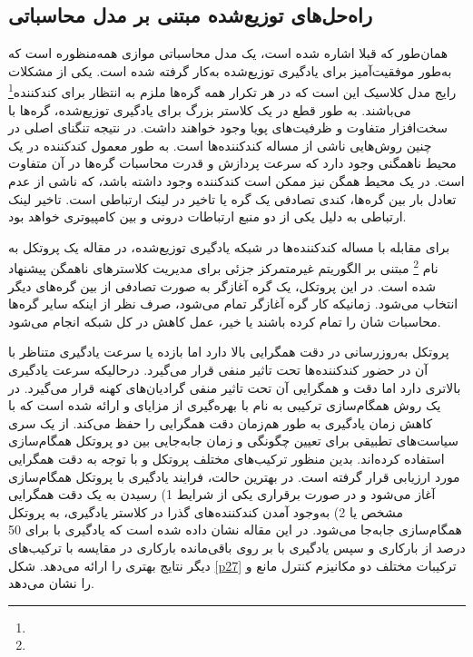 \subsection{راه‌حل‌های توزیع‌شده مبتنی بر مدل محاسباتی }\label{CmpMld}

همان‌طور که قبلا اشاره شده است،  یک مدل محاسباتی موازی همه‌منظوره است که به‌طور موفقیت‌آمیز برای یادگیری توزیع‌شده به‌کار گرفته شده است. یکی از مشکلات رایج مدل  کلاسیک این است که در هر تکرار همه گره‌ها ملزم به انتظار برای کند‌کننده\footnote{}  می‌باشند. به طور قطع در یک کلاستر بزرگ برای یادگیری توزیع‌شده، گره‌ها با سخت‌افزار متفاوت و ظرفیت‌های پویا وجود خواهند داشت. در نتیجه تنگنای اصلی در چنین روش‌هایی ناشی از مساله کند‌کننده‌ها است. به طور معمول کند‌کننده در یک محیط ناهمگنی وجود دارد که سرعت پردازش و قدرت محاسبات گره‌ها در آن متفاوت است. در یک محیط همگن نیز ممکن است کند‌کننده وجود داشته باشد، که ناشی از عدم تعادل بار بین گره‌ها، کندی تصادفی یک گره یا تاخیر در لینک ارتباطی است. تاخیر لینک ارتباطی به دلیل یکی از دو منبع ارتباطات درونی و بین کامپیوتری خواهد بود. 

برای مقابله با مساله کند‌کننده‌ها در شبکه یادگیری توزیع‌شده، در مقاله \cite{Mitigating2020} یک پروتکل به نام \footnote{} مبتنی بر الگوریتم غیرمتمرکز  جزئی برای مدیریت کلاسترهای ناهمگن پیشنهاد شده است. در این پروتکل، یک گره آغازگر به صورت تصادفی از بین گره‌های دیگر انتخاب می‌شود. زمانیکه کار گره آغازگر تمام می‌شود، صرف نظر از اینکه سایر گره‌ها محاسبات شان را تمام کرده باشند یا خیر، عمل کاهش در کل شبکه انجام می‌شود. 

پروتکل به‌روزرسانی در  دقت همگرایی بالا دارد اما بازده یا سرعت یادگیری متناظر با آن در حضور کند‌کننده‌ها تحت تاثیر منفی قرار می‌گیرد. درحالیکه  سرعت یادگیری بالاتری دارد اما دقت و همگرایی آن تحت تاثیر منفی گرادیان‌های کهنه قرار می‌گیرد. در \cite{Syncswitch2021} یک روش همگام‌سازی ترکیبی به نام  با بهره‌گیری از مزایای  و  ارائه شده است که با کاهش زمان یادگیری به طور هم‌زمان دقت همگرایی را حفظ می‌کند. از یک سری سیاست‌های تطبیقی برای تعیین چگونگی و زمان جا‌به‌جایی بین دو پروتکل‌ همگام‌سازی استفاده کرده‌اند. بدین منظور ترکیب‌های مختلف پروتکل  و  با توجه به دقت همگرایی مورد ارزیابی قرار گرفته است. در بهترین حالت، فرایند یادگیری با پروتکل همگام‌سازی  آغاز می‌شود و در صورت برقراری یکی از شرایط 1) رسیدن به یک دقت همگرایی مشخص یا 2) به‌وجود آمدن کند‌کننده‌های گذرا در کلاستر یادگیری، به پروتکل همگام‌سازی  جابه‌جا می‌شود. در این مقاله نشان داده شده است که یادگیری با  برای 50 درصد از بارکاری و سپس یادگیری با  بر روی باقی‌مانده بارکاری در مقایسه با ترکیب‌های دیگر نتایج بهتری را ارائه می‌دهد. شکل \ref{p27} ترکیبات مختلف دو مکانیزم کنترل مانع  و  را نشان می‌دهد. 


